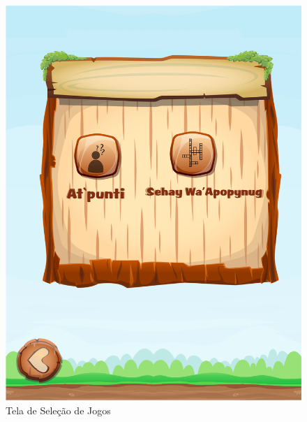 \documentclass[12pt]{article}
\begin{document}
	\begin{figure}[!htb]
		\centering
		\includegraphics[width=\linewidth]{img/selecNivel.png}
		\caption{Tela de Seleção de Jogos}\label{fig:jogos}
		\endminipage \hspace{0.5cm}

\end{figure}
\end{document}
